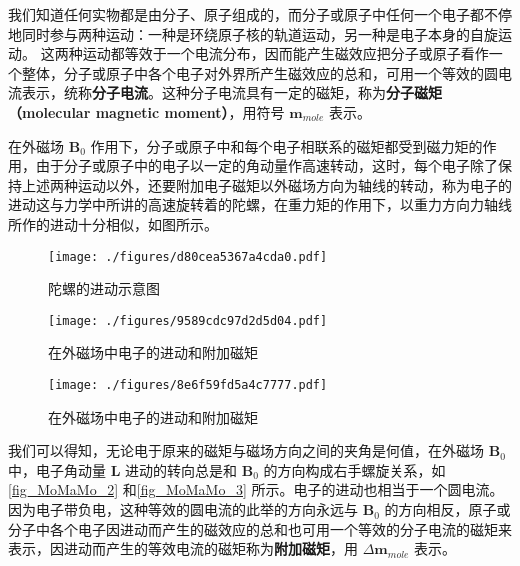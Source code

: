 
我们知道任何实物都是由分子、原子组成的，而分子或原子中任何一个电子都不停地同时参与两种运动：一种是环绕原子核的轨道运动，另一种是电子本身的自旋运动。 这两种运动都等效于一个电流分布，因而能产生磁效应把分子或原子看作一个整体，分子或原子中各个电子对外界所产生磁效应的总和，可用一个等效的圆电流表示，统称\textbf{分子电流}。这种分子电流具有一定的磁矩，称为\textbf{分子磁矩（molecular magnetic moment）}，用符号 $\mathbf m_{mole}$ 表示。

在外磁场 $\mathbf B_0$ 作用下，分子或原子中和每个电子相联系的磁矩都受到磁力矩的作用，由于分子或原子中的电子以一定的角动量作高速转动，这时，每个电子除了保持上述两种运动以外，还要附加电子磁矩以外磁场方向为轴线的转动，称为电子的进动这与力学中所讲的高速旋转着的陀螺，在重力矩的作用下，以重力方向力轴线所作的进动十分相似，如图所示。
\begin{figure}[ht]
\centering
\texttt{[image: ./figures/d80cea5367a4cda0.pdf]}
\caption{陀螺的进动示意图} \label{fig_MoMaMo_1}
\end{figure}
\begin{figure}[ht]
\centering
\texttt{[image: ./figures/9589cdc97d2d5d04.pdf]}
\caption{在外磁场中电子的进动和附加磁矩} \label{fig_MoMaMo_2}
\end{figure}
\begin{figure}[ht]
\centering
\texttt{[image: ./figures/8e6f59fd5a4c7777.pdf]}
\caption{在外磁场中电子的进动和附加磁矩} \label{fig_MoMaMo_3}
\end{figure}

我们可以得知，无论电于原来的磁矩与磁场方向之间的夹角是何值，在外磁场 $\mathbf B_0$ 中，电子角动量 $\mathbf L$ 进动的转向总是和 $\mathbf B_0$ 的方向构成右手螺旋关系，如\autoref{fig_MoMaMo_2} 和\autoref{fig_MoMaMo_3} 所示。电子的进动也相当于一个圆电流。因为电子带负电，这种等效的圆电流的此举的方向永远与 $\mathbf B_0$ 的方向相反，原子或分子中各个电子因进动而产生的磁效应的总和也可用一个等效的分子电流的磁矩来表示，因进动而产生的等效电流的磁矩称为\textbf{附加磁矩}，用 $\Delta\mathbf m_{mole}$ 表示。
